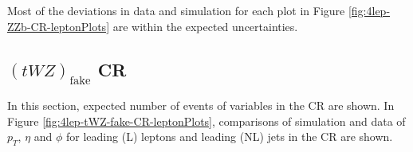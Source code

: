 Most of the deviations in data and simulation for each plot in Figure \ref{fig:4lep-ZZb-CR-leptonPlots} are within the expected uncertainties.


\subsection{$(tWZ)_{\text{fake}}$ CR}
\label{sec:controlplotstetralepton-tWZ-fake-CR}


In this section, expected number of events of variables in the \tWZfake CR are shown. In Figure \ref{fig:4lep-tWZ-fake-CR-leptonPlots}, comparisons of simulation and data of $p_{T}$, $\eta$ and $\phi$ for leading (L) leptons and leading (NL) jets in the \tWZfake CR are shown.

